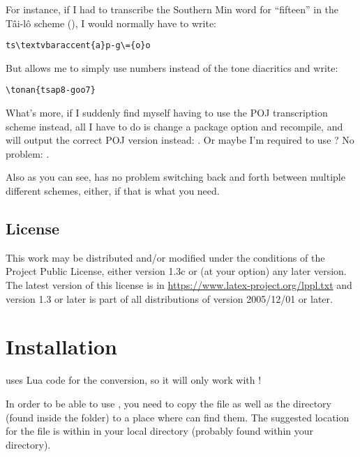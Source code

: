 \documentclass{ltxdockit}
\begin{document}
For instance, if I had to transcribe the Southern Min word for \enquote{fifteen}
in the T\^{a}i-l\^{o} scheme (), I would normally have to write:

\begin{lstlisting}[language={[latex]tex}]
ts\textvbaraccent{a}p-g\={o}o
\end{lstlisting}

But  allows me to simply use numbers instead of the tone
diacritics and write:

\begin{lstlisting}[language={[latex]tex}]
\tonan{tsap8-goo7}
\end{lstlisting}

What's more, if I suddenly find myself having to use the POJ transcription
scheme instead, all I have to do is change a package option and recompile, and
 will output the correct POJ version instead: .
Or maybe I'm required to use ? No problem:
.

Also as you can see,  has no problem switching back and forth
between multiple different schemes, either, if that is what you need.

\subsection{License}

This work may be distributed and/or modified under the conditions of the
 Project Public License, either version 1.3c or (at your option)
any later version. The latest version of this license is in
\url{https://www.latex-project.org/lppl.txt} and version 1.3 or later is part of
all distributions of  version 2005/12/01 or later.

\section{Installation}

 uses Lua code for the conversion, so it will only work with
!

In order to be able to use , you need to copy the
 file as well as the  directory (found inside
the  folder) to a place where  can find them. The
suggested location for the  file is within  in
your local  directory (probably found within your 
directory).
\end{document}
